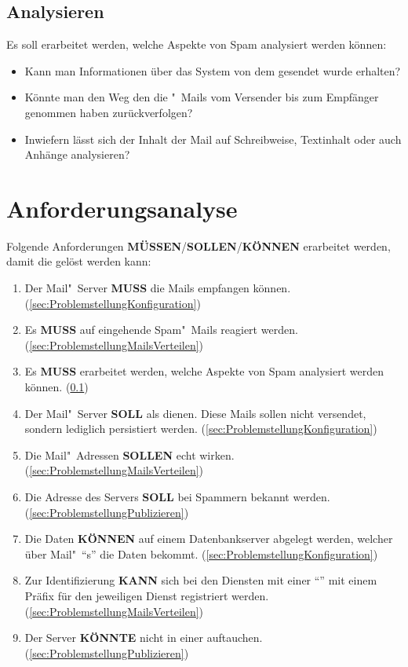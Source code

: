 \documentclass[a4paper,11pt,singlespacing]{article}
\begin{document}
	\subsection{Analysieren}\label{sec:ProblemstellungAnalysieren}
		Es soll erarbeitet werden, welche Aspekte von Spam analysiert werden können:
		\begin{itemize}
		\item Kann man Informationen über das System von dem gesendet wurde erhalten?
		\item Könnte man den Weg den die "~Mails vom Versender bis zum Empfänger genommen haben zurückverfolgen?
		\item Inwiefern lässt sich der Inhalt der Mail auf Schreibweise, Textinhalt oder auch Anhänge analysieren?
		\end{itemize}

\newpage


\section{Anforderungsanalyse}\label{sec:Anforderungsanalyse}
	Folgende Anforderungen \textbf{MÜSSEN}/\textbf{SOLLEN}/\textbf{KÖNNEN} erarbeitet werden, damit die  gelöst werden kann:

	\begin{enumerate}
	\item
		Der Mail"~Server \textbf{MUSS} die Mails empfangen können.
		(\ref{sec:ProblemstellungKonfiguration})
	\item
		Es \textbf{MUSS} auf eingehende Spam"~Mails reagiert werden.
		(\ref{sec:ProblemstellungMailsVerteilen})
	\item
		Es \textbf{MUSS} erarbeitet werden, welche Aspekte von Spam analysiert werden können.
		(\ref{sec:ProblemstellungAnalysieren})
	\item
		Der Mail"~Server \textbf{SOLL} als  dienen.
		Diese Mails sollen nicht versendet, sondern lediglich persistiert werden.
		(\ref{sec:ProblemstellungKonfiguration})
	\item
		Die Mail"~Adressen \textbf{SOLLEN} echt wirken.
		(\ref{sec:ProblemstellungMailsVerteilen})
	\item
		Die Adresse des  Servers \textbf{SOLL} bei Spammern bekannt werden.
		(\ref{sec:ProblemstellungPublizieren})
	\item
		Die Daten \textbf{KÖNNEN} auf einem Datenbankserver abgelegt werden, welcher über Mail"~"`s"' die Daten bekommt.
		(\ref{sec:ProblemstellungKonfiguration})
	\item
		Zur Identifizierung \textbf{KANN} sich bei den Diensten mit einer "`"' mit einem Präfix für den jeweiligen Dienst registriert werden.
		(\ref{sec:ProblemstellungMailsVerteilen})
	\item
		Der Server \textbf{KÖNNTE} nicht in einer   auftauchen.
		(\ref{sec:ProblemstellungPublizieren})
	\end{enumerate}
\end{document}
